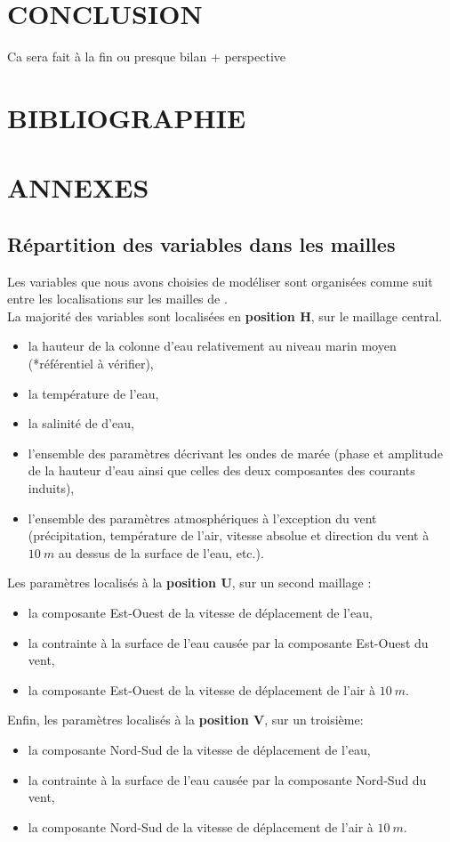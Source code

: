 \documentclass[10pt,a4paper,titlepage]{article}
\begin{document}
\newpage

\section{CONCLUSION}
\label{sec:conclusion}

Ca sera fait à la fin ou presque
bilan + perspective

\newpage
\section{BIBLIOGRAPHIE}
%
%
\printbibliography

\newpage
\section{ANNEXES}
\label{annexes}
\subsection{Répartition des variables dans les mailles}
Les variables que nous avons choisies de modéliser sont organisées comme suit entre les localisations sur les mailles de \cite{Arakawa_C-grid_1977}.\\
La majorité des variables sont localisées en \textbf{position H}, sur le maillage central.
\begin{itemize}
    \item la hauteur de la colonne d'eau relativement au niveau marin moyen (*référentiel à vérifier),
    \item la température de l'eau,
    \item la salinité de d'eau,
    \item l'ensemble des paramètres décrivant les ondes de marée (phase et amplitude de la hauteur d'eau ainsi que celles des deux composantes des courants induits),
    \item l'ensemble des paramètres atmosphériques à l'exception du vent (précipitation, température de l'air, vitesse absolue et direction du vent à $10~m$ au dessus de la surface de l'eau, etc.).
\end{itemize}
Les paramètres localisés à la \textbf{position U}, sur un second maillage :
\begin{itemize}
    \item la composante Est-Ouest de la vitesse de déplacement de l'eau,
    \item la contrainte à la surface de l'eau causée par la composante Est-Ouest du vent,
    \item la composante Est-Ouest de la vitesse de déplacement de l'air à $10~m$.
\end{itemize}
Enfin, les paramètres localisés à la \textbf{position V}, sur un troisième:
\begin{itemize}
    \item la composante Nord-Sud de la vitesse de déplacement de l'eau,
    \item la contrainte à la surface de l'eau causée par la composante Nord-Sud du vent,
    \item la composante Nord-Sud de la vitesse de déplacement de l'air à $10~m$.
\end{itemize}
\end{document}
